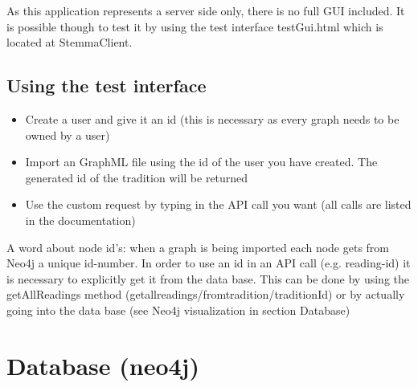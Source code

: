 \documentclass[11pt,fleqn,openany]{book} %
\begin{document}
As this application represents a server side only, there is no full GUI included. It is possible though to test it by using the test interface testGui.html which is located at StemmaClient.

\section*{Using the test interface}

\begin{itemize}
\item Create a user and give it an id (this is necessary as every graph needs to be owned by a user)
\item Import an GraphML file using the id of the user you have created. The generated id of the tradition will be returned
\item Use the custom request by typing in the API call you want (all calls are listed in the documentation)
\end{itemize}
A word about node id's: when a graph is being imported each node gets from Neo4j a unique id-number. In order to use an id in an API call (e.g. reading-id) it is necessary to explicitly get it from the data base. This can be done by using the getAllReadings method (getallreadings/fromtradition/{traditionId}) or by actually going into the data base (see Neo4j visualization in section Database)



\chapter{Database (neo4j)}
\end{document}
